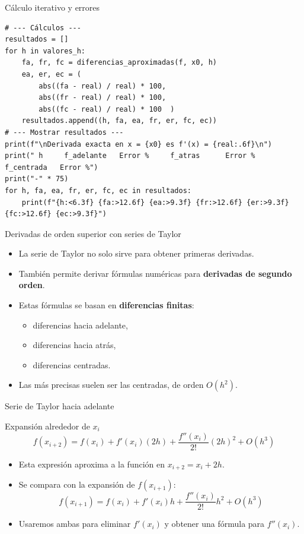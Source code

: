 \documentclass[main.tex]{subfiles}
\begin{document}
\begin{frame}[fragile]{Cálculo iterativo y errores}
\begin{lstlisting}[style=mypython]
# --- Cálculos ---
resultados = []
for h in valores_h:
    fa, fr, fc = diferencias_aproximadas(f, x0, h)
    ea, er, ec = (
        abs((fa - real) / real) * 100,
        abs((fr - real) / real) * 100,
        abs((fc - real) / real) * 100  )
    resultados.append((h, fa, ea, fr, er, fc, ec))
# --- Mostrar resultados ---
print(f"\nDerivada exacta en x = {x0} es f'(x) = {real:.6f}\n")
print(" h     f_adelante   Error %     f_atras      Error %     f_centrada   Error %")
print("-" * 75)
for h, fa, ea, fr, er, fc, ec in resultados:
    print(f"{h:<6.3f} {fa:>12.6f} {ea:>9.3f} {fr:>12.6f} {er:>9.3f} {fc:>12.6f} {ec:>9.3f}")
\end{lstlisting}
\end{frame}

\begin{frame}{Derivadas de orden superior con series de Taylor}
\small
\begin{itemize}
  \item La serie de Taylor no solo sirve para obtener primeras derivadas.
  \item También permite derivar fórmulas numéricas para \textbf{derivadas de segundo orden}.
  \item Estas fórmulas se basan en \textbf{diferencias finitas}:
  \begin{itemize}
     \item diferencias hacia adelante,
     \item diferencias hacia atrás,
     \item diferencias centradas.
  \end{itemize}
  \item Las más precisas suelen ser las centradas, de orden \(O(h^2)\).
\end{itemize}
\end{frame}

\begin{frame}{Serie de Taylor hacia adelante}
\small

\begin{block}{Expansión alrededor de \(x_i\)}
\[
f(x_{i+2}) = f(x_i)  + f'(x_i)(2h) + \frac{f''(x_i)}{2!}(2h)^2 + O(h^3)
\]
\end{block}

\begin{itemize}
  \item Esta expresión aproxima a la función en \(x_{i+2} = x_i + 2h\).
  \item Se compara con la expansión de \(f(x_{i+1})\):
\[
f(x_{i+1}) = f(x_i) 
+ f'(x_i)h
+ \frac{f''(x_i)}{2!}h^2
+ O(h^3)
\]
  \item Usaremos ambas para eliminar \(f'(x_i)\) y obtener una fórmula para \(f''(x_i)\).
\end{itemize}
\end{frame}
\end{document}
